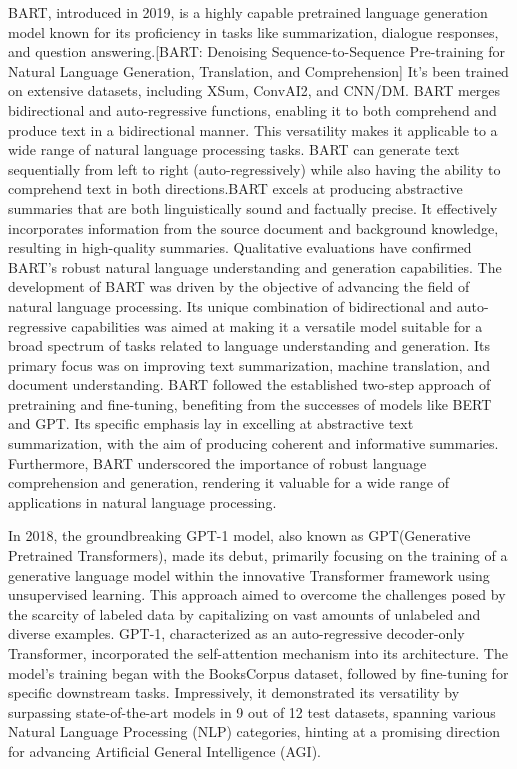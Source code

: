 \documentclass[conference]{IEEEtran}
\begin{document}
BART, introduced in 2019, is a highly capable pretrained language generation model known for its proficiency in tasks like summarization, dialogue responses, and question answering.[BART: Denoising Sequence-to-Sequence Pre-training for Natural Language Generation, Translation, and Comprehension] It's been trained on extensive datasets, including XSum, ConvAI2, and CNN/DM. BART merges bidirectional and auto-regressive functions, enabling it to both comprehend and produce text in a bidirectional manner. This versatility makes it applicable to a wide range of natural language processing tasks. BART can generate text sequentially from left to right (auto-regressively) while also having the ability to comprehend text in both directions.BART excels at producing abstractive summaries that are both linguistically sound and factually precise. It effectively incorporates information from the source document and background knowledge, resulting in high-quality summaries. Qualitative evaluations have confirmed BART's robust natural language understanding and generation capabilities.
The development of BART was driven by the objective of advancing the field of natural language processing. Its unique combination of bidirectional and auto-regressive capabilities was aimed at making it a versatile model suitable for a broad spectrum of tasks related to language understanding and generation. Its primary focus was on improving text summarization, machine translation, and document understanding. BART followed the established two-step approach of pretraining and fine-tuning, benefiting from the successes of models like BERT and GPT. Its specific emphasis lay in excelling at abstractive text summarization, with the aim of producing coherent and informative summaries. Furthermore, BART underscored the importance of robust language comprehension and generation, rendering it valuable for a wide range of applications in natural language processing.


In 2018, the groundbreaking GPT-1 model, also known as GPT(Generative Pretrained Transformers), made its debut, primarily focusing on the training of a generative language model within the innovative Transformer framework using unsupervised learning. This approach aimed to overcome the challenges posed by the scarcity of labeled data by capitalizing on vast amounts of unlabeled and diverse examples. GPT-1, characterized as an auto-regressive decoder-only Transformer, incorporated the self-attention mechanism into its architecture. The model's training began with the BooksCorpus dataset, followed by fine-tuning for specific downstream tasks. Impressively, it demonstrated its versatility by surpassing state-of-the-art models in 9 out of 12 test datasets, spanning various Natural Language Processing (NLP) categories, hinting at a promising direction for advancing Artificial General Intelligence (AGI).
\end{document}
